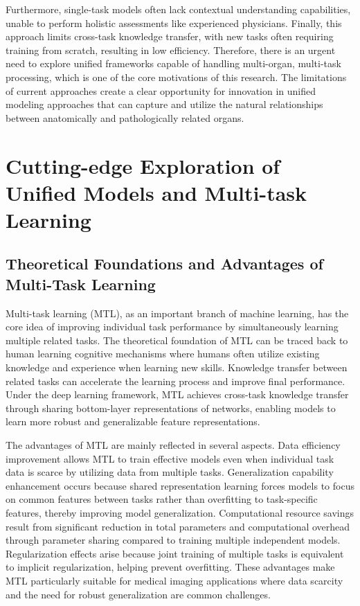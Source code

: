 Furthermore, single-task models often lack contextual understanding capabilities, unable to perform holistic assessments like experienced physicians. Finally, this approach limits cross-task knowledge transfer, with new tasks often requiring training from scratch, resulting in low efficiency. Therefore, there is an urgent need to explore unified frameworks capable of handling multi-organ, multi-task processing, which is one of the core motivations of this research. The limitations of current approaches create a clear opportunity for innovation in unified modeling approaches that can capture and utilize the natural relationships between anatomically and pathologically related organs.

\section{Cutting-edge Exploration of Unified Models and Multi-task Learning}

\subsection{Theoretical Foundations and Advantages of Multi-Task Learning}

Multi-task learning (MTL), as an important branch of machine learning, has the core idea of improving individual task performance by simultaneously learning multiple related tasks. The theoretical foundation of MTL can be traced back to human learning cognitive mechanisms where humans often utilize existing knowledge and experience when learning new skills. Knowledge transfer between related tasks can accelerate the learning process and improve final performance. Under the deep learning framework, MTL achieves cross-task knowledge transfer through sharing bottom-layer representations of networks, enabling models to learn more robust and generalizable feature representations.

The advantages of MTL are mainly reflected in several aspects. Data efficiency improvement allows MTL to train effective models even when individual task data is scarce by utilizing data from multiple tasks. Generalization capability enhancement occurs because shared representation learning forces models to focus on common features between tasks rather than overfitting to task-specific features, thereby improving model generalization. Computational resource savings result from significant reduction in total parameters and computational overhead through parameter sharing compared to training multiple independent models. Regularization effects arise because joint training of multiple tasks is equivalent to implicit regularization, helping prevent overfitting. These advantages make MTL particularly suitable for medical imaging applications where data scarcity and the need for robust generalization are common challenges.

